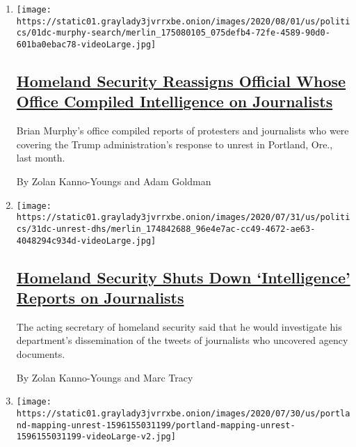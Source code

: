 \begin{enumerate}
\def\labelenumi{\arabic{enumi}.}
\item
  \texttt{[image: https://static01.graylady3jvrrxbe.onion/images/2020/08/01/us/politics/01dc-murphy-search/merlin\_175080105\_075defb4-72fe-4589-90d0-601ba0ebac78-videoLarge.jpg]}

  \hypertarget{homeland-security-reassigns-official-whose-office-compiled-intelligence-on-journalists}{%
  \subsection{\texorpdfstring{\href{/2020/08/01/us/politics/brian-murphy-homeland-security-protesters.html}{Homeland
  Security Reassigns Official Whose Office Compiled Intelligence on
  Journalists}}{Homeland Security Reassigns Official Whose Office Compiled Intelligence on Journalists}}\label{homeland-security-reassigns-official-whose-office-compiled-intelligence-on-journalists}}

  Brian Murphy's office compiled reports of protesters and journalists
  who were covering the Trump administration's response to unrest in
  Portland, Ore., last month.

  By Zolan Kanno-Youngs and Adam Goldman
\item
  \texttt{[image: https://static01.graylady3jvrrxbe.onion/images/2020/07/31/us/politics/31dc-unrest-dhs/merlin\_174842688\_96e4e7ac-cc49-4672-ae63-4048294c934d-videoLarge.jpg]}

  \hypertarget{homeland-security-shuts-down-intelligence-reports-on-journalists}{%
  \subsection{\texorpdfstring{\href{/2020/07/31/us/politics/homeland-security-portland.html}{Homeland
  Security Shuts Down `Intelligence' Reports on
  Journalists}}{Homeland Security Shuts Down `Intelligence' Reports on Journalists}}\label{homeland-security-shuts-down-intelligence-reports-on-journalists}}

  The acting secretary of homeland security said that he would
  investigate his department's dissemination of the tweets of
  journalists who uncovered agency documents.

  By Zolan Kanno-Youngs and Marc Tracy
\item
  \texttt{[image: https://static01.graylady3jvrrxbe.onion/images/2020/07/30/us/portland-mapping-unrest-1596155031199/portland-mapping-unrest-1596155031199-videoLarge-v2.jpg]}


\end{enumerate}
